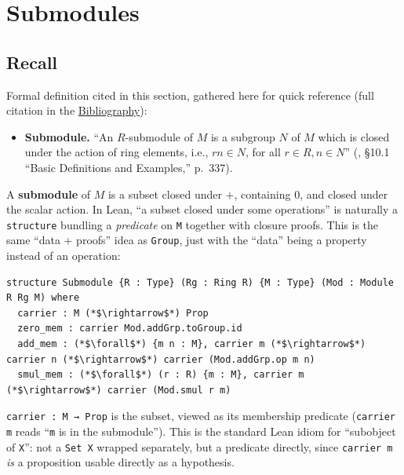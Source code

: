 \section{Submodules}\label{sec:10-modules:04-submodules:1}

\subsection{Recall}\label{sec:10-modules:04-submodules:2}

Formal definition cited in this section, gathered here for quick reference (full citation in the \hyperref[sec:root:bibliography:1]{Bibliography}):

\begin{itemize}
\tightlist
\item
  \textbf{Submodule.} ``An \(R\)-submodule of \(M\) is a subgroup \(N\) of \(M\) which is closed under the action of ring elements, i.e., \(rn \in N\), for all \(r \in R, n \in N\)'' (\cite{DummitFoote2003}, §10.1 ``Basic Definitions and Examples,'' p.~337).
\end{itemize}

A \textbf{submodule} of \(M\) is a subset closed under \(+\), containing \(0\), and closed under the scalar action. In Lean, ``a subset closed under some operations'' is naturally a \texttt{structure} bundling a \emph{predicate} on \texttt{M} together with closure proofs. This is the same ``data + proofs'' idea as \texttt{Group}, just with the ``data'' being a property instead of an operation:

\begin{lstlisting}
structure Submodule {R : Type} (Rg : Ring R) {M : Type} (Mod : Module R Rg M) where
  carrier : M (*$\rightarrow$*) Prop
  zero_mem : carrier Mod.addGrp.toGroup.id
  add_mem : (*$\forall$*) {m n : M}, carrier m (*$\rightarrow$*) carrier n (*$\rightarrow$*) carrier (Mod.addGrp.op m n)
  smul_mem : (*$\forall$*) (r : R) {m : M}, carrier m (*$\rightarrow$*) carrier (Mod.smul r m)
\end{lstlisting}

\texttt{carrier : M → Prop} is the subset, viewed as its membership predicate (\texttt{carrier m} reads ``\texttt{m} is in the submodule''). This is the standard Lean idiom for ``subobject of \texttt{X}'': not a \texttt{Set X} wrapped separately, but a predicate directly, since \texttt{carrier m} \emph{is} a proposition usable directly as a hypothesis.

